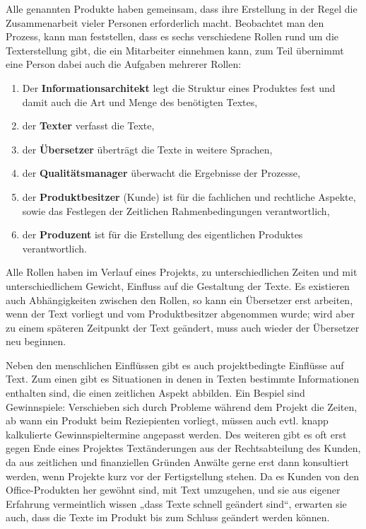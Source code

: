 \documentclass[11pt,a4paper]{article}
\begin{document}
Alle genannten Produkte haben gemeinsam, dass ihre Erstellung in der Regel die Zusammenarbeit vieler Personen erforderlich macht. Beobachtet man den Prozess, kann man feststellen, dass es sechs verschiedene Rollen rund um die Texterstellung gibt, die ein Mitarbeiter einnehmen kann, zum Teil übernimmt eine Person dabei auch die Aufgaben mehrerer Rollen:
\begin{enumerate}
\addtolength{\itemsep}{-0.5\baselineskip}
\item Der \textbf{Informationsarchitekt} legt die Struktur eines Produktes fest und damit auch die Art und Menge des benötigten Textes,
\item der \textbf{Texter} verfasst die Texte,
\item der \textbf{Übersetzer} überträgt die Texte in weitere Sprachen,
\item der \textbf{Qualitätsmanager} überwacht die Ergebnisse der Prozesse,
\item der \textbf{Produktbesitzer} (Kunde) ist für die fachlichen und rechtliche Aspekte, sowie das Festlegen der Zeitlichen Rahmenbedingungen verantwortlich,
\item der \textbf{Produzent} ist für die Erstellung des eigentlichen Produktes verantwortlich.
\end{enumerate}
Alle Rollen haben im Verlauf eines Projekts, zu unterschiedlichen Zeiten und mit unterschiedlichem Gewicht, Einfluss auf die Gestaltung der Texte. Es existieren auch Abhängigkeiten zwischen den Rollen, so kann ein Übersetzer erst arbeiten, wenn der Text vorliegt und vom Produktbesitzer abgenommen wurde; wird aber zu einem späteren Zeitpunkt der Text geändert, muss auch wieder der Übersetzer neu beginnen.

Neben den menschlichen Einflüssen gibt es auch projektbedingte Einflüsse auf Text. Zum einen gibt es Situationen in denen in Texten bestimmte Informationen enthalten sind, die einen zeitlichen Aspekt abbilden. Ein Bespiel sind Gewinnspiele: Verschieben sich durch Probleme während dem Projekt die Zeiten, ab wann ein Produkt beim Reziepienten vorliegt, müssen auch evtl. knapp kalkulierte Gewinnspieltermine angepasst werden. Des weiteren gibt es oft erst gegen Ende eines Projektes Textänderungen aus der Rechtsabteilung des Kunden, da aus zeitlichen und finanziellen Gründen Anwälte gerne erst dann konsultiert werden, wenn Projekte kurz vor der Fertigstellung stehen. Da es Kunden von den Office-Produkten her gewöhnt sind, mit Text umzugehen, und sie aus eigener Erfahrung vermeintlich wissen „dass Texte schnell geändert sind“, erwarten sie auch, dass die Texte im Produkt bis zum Schluss geändert werden können.
\end{document}
